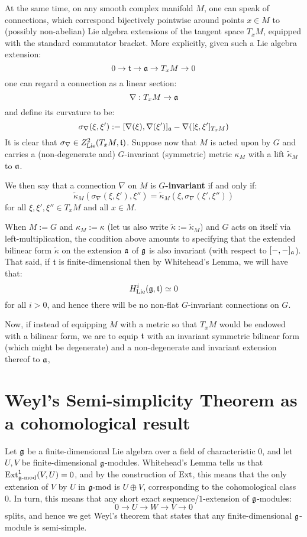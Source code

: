         At the same time, on any smooth complex manifold $M$, one can speak of connections, which correspond bijectively pointwise around points $x \in M$ to (possibly non-abelian) Lie algebra extensions of the tangent space $T_xM$, equipped with the standard commutator bracket. More explicitly, given such a Lie algebra extension:
            $$0 \to \mathfrak{t} \to \mathfrak{a} \to T_xM \to 0$$
        one can regard a connection as a linear section:
            $$\nabla: T_xM \to \mathfrak{a}$$
        and define its curvature to be:
            $$\sigma_{\nabla}(\xi, \xi') := [\nabla(\xi), \nabla(\xi')]_{\mathfrak{a}} - \nabla( [\xi, \xi']_{T_xM} )$$
        It is clear that $\sigma_{\nabla} \in Z^2_{\mathrm{Lie}}(T_xM, \mathfrak{t})$. Suppose now that $M$ is acted upon by $G$ and carries a (non-degenerate and) $G$-invariant (symmetric) metric $\kappa_M$ with a lift $\tilde{\kappa}_M$ to $\mathfrak{a}$.
        \begin{definition}
            We then say that a connection $\nabla$ on $M$ is \textbf{$G$-invariant} if and only if:
                $$\tilde{\kappa}_M(\sigma_{\nabla}(\xi, \xi'), \xi'') = \tilde{\kappa}_M(\xi, \sigma_{\nabla}(\xi', \xi''))$$
            for all $\xi, \xi', \xi'' \in T_xM$ and all $x \in M$.
        \end{definition}
        
        When $M := G$ and $\kappa_M := \kappa$ (let us also write $\tilde{\kappa} := \tilde{\kappa}_M$) and $G$ acts on itself via left-multiplication, the condition above amounts to specifying that the extended bilinear form $\tilde{\kappa}$ on the extension $\mathfrak{a}$ of $\mathfrak{g}$ is also invariant (with respect to $[- ,-]_{\mathfrak{a}}$). That said, if $\mathfrak{t}$ is finite-dimensional then by Whitehead's Lemma, we will have that:
            $$H^i_{\mathrm{Lie}}(\mathfrak{g}, \mathfrak{t}) \simeq 0$$
        for all $i > 0$, and hence there will be no non-flat $G$-invariant connections on $G$.

        Now, if instead of equipping $M$ with a metric so that $T_xM$ would be endowed with a bilinear form, we are to equip $\mathfrak{t}$ with an invariant symmetric bilinear form (which might be degenerate) and a non-degenerate and invariant extension thereof to $\mathfrak{a}$,

    \section{Weyl's Semi-simplicity Theorem as a cohomological result}
        Let $\mathfrak{g}$ be a finite-dimensional Lie algebra over a field of characteristic $0$, and let $U, V$ be finite-dimensional $\mathfrak{g}$-modules. Whitehead's Lemma tells us that $\mathrm{Ext}^1_{\mathfrak{g}\text{-}\mathrm{mod}}(V, U) = 0$, and by the construction of $\mathrm{Ext}$, this means that the only extension of $V$ by $U$ in $\mathfrak{g}\text{-}\mathrm{mod}$ is $U \oplus V$, corresponding to the cohomological class $0$. In turn, this means that any short exact sequence/$1$-extension of $\mathfrak{g}$-modules:
            $$0 \to U \to W \to V \to 0$$
        splits, and hence we get Weyl's theorem that states that any finite-dimensional $\mathfrak{g}$-module is semi-simple.

